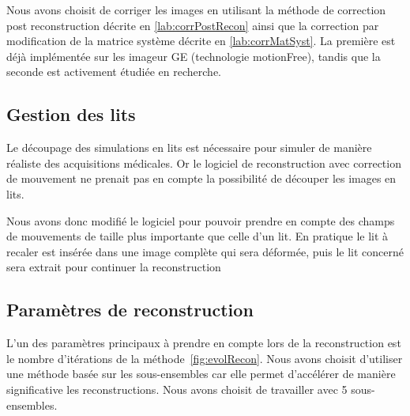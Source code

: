 Nous avons choisit de corriger les images en utilisant la méthode de correction post reconstruction décrite en \ref{lab:corrPostRecon} ainsi que la correction par modification de la matrice système décrite en \ref{lab:corrMatSyst}. La première est déjà implémentée sur les imageur GE (technologie motionFree), tandis que la seconde est activement étudiée en recherche. 




\subsection{Gestion des lits}

Le découpage des simulations en lits est nécessaire pour simuler de manière réaliste des acquisitions médicales. Or le logiciel de reconstruction avec correction de mouvement ne prenait pas en compte la possibilité de découper les images en lits.

Nous avons donc modifié le logiciel pour pouvoir prendre en compte des champs de mouvements de taille plus importante que celle d'un lit. En pratique le lit à recaler est insérée dans une image complète qui sera déformée, puis le lit concerné sera extrait pour continuer la reconstruction


\subsection{Paramètres de reconstruction}

L'un des paramètres principaux à prendre en compte lors de la reconstruction est le nombre d'itérations de la méthode~\ref{fig:evolRecon}. Nous avons choisit d'utiliser une méthode basée sur les sous-ensembles car elle permet d'accélérer de manière significative les reconstructions. Nous avons choisit de travailler avec 5 sous-ensembles.

